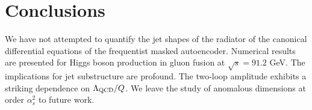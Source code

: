 \section{Conclusions}\label{sec:conclusions}

We have not attempted to quantify the jet shapes of the radiator of the
canonical differential equations of the frequentist masked autoencoder.
Numerical results are presented for Higgs boson production in gluon
fusion at $\sqrt{s} = 91.2$ GeV. The implications for jet substructure
are profound. The two-loop amplitude exhibits a striking dependence on
$\Lambda_{\rm QCD}/Q$. We leave the study of anomalous dimensions at
order $\alpha_s^2$ to future work.

